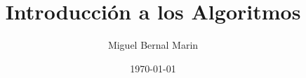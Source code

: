 \documentclass[aspectratio=169]{beamer}
\title{Introducción a los Algoritmos}
\author{Miguel Bernal Marin} %
\institute[TecMM Zapopan] %
{
 Instituto Tecnológico\\
 José Mario Molina\\
 Pasquel y Henríquez\\%
\medskip
\textit{miguel.bernal@zapopan.tecmm.edu.mx} %
}
\date{
    \today
} %
\newcommand{\nologo}{\setbeamertemplate{logo}{}} %
\begin{document}
\begin{frame}
    \titlepage
\end{frame}


\end{document}
